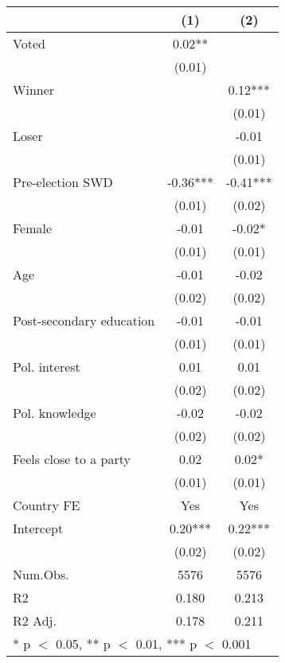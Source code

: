 \begin{table}
\centering
\begin{tabular}[t]{lcc}
\toprule
  & (1) & (2)\\
\midrule
Voted & 0.02** & \\
 & (0.01) & \\
Winner &  & 0.12***\\
 &  & \vphantom{1} (0.01)\\
Loser &  & -0.01\\
 &  & (0.01)\\
Pre-election SWD & -0.36*** & -0.41***\\
 & (0.01) & (0.02)\\
Female & -0.01 & -0.02*\\
 & (0.01) & \vphantom{2} (0.01)\\
Age & -0.01 & -0.02\\
 & (0.02) & \vphantom{3} (0.02)\\
Post-secondary education & -0.01 & -0.01\\
 & (0.01) & \vphantom{1} (0.01)\\
Pol. interest & 0.01 & 0.01\\
 & (0.02) & \vphantom{2} (0.02)\\
Pol. knowledge & -0.02 & -0.02\\
 & (0.02) & \vphantom{1} (0.02)\\
Feels close to a party & 0.02 & 0.02*\\
 & (0.01) & (0.01)\\
Country FE & Yes & Yes\\
Intercept & 0.20*** & 0.22***\\
 & (0.02) & (0.02)\\
\midrule
Num.Obs. & 5576 & 5576\\
R2 & 0.180 & 0.213\\
R2 Adj. & 0.178 & 0.211\\
\bottomrule
\multicolumn{3}{l}{\rule{0pt}{1em}* p $<$ 0.05, ** p $<$ 0.01, *** p $<$ 0.001}\\
\end{tabular}
\end{table}
